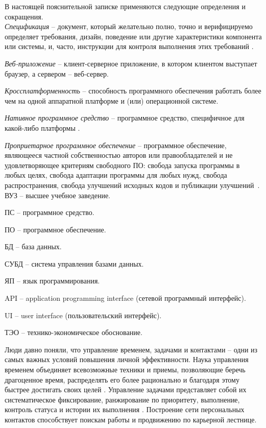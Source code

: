 \label{sec:definitions}

В настоящей пояснительной записке применяются следующие определения и сокращения.
\\

\emph{Спецификация} -- документ, который желательно полно, точно и верифицируемо определяет требования, дизайн, поведение или другие характеристики компонента или системы, и, часто, инструкции для контроля выполнения этих требований \cite{istqb_specification}.

\emph{Веб-приложение} -- клиент-серверное приложение, в котором клиентом выступает браузер, а сервером -- веб-сервер.

\emph{Кроссплатформенность} -- способность программного обеспечения работать более чем на одной аппаратной платформе и (или) операционной системе.

\emph{Нативное программное средство} -- программное средство, специфичное для какой-либо платформы \cite{habr_crossplatform}.

\emph{Проприетарное программное обеспечение} -- программное обеспечение, являющееся частной собственностью авторов или правообладателей и не удовлетворяющее критериям свободного ПО: свобода запуска программы в любых целях, свобода адаптации программы для любых нужд, свобода распространения, свобода улучшений исходных кодов и публикации улучшений~\cite{free_software}.
\\

ВУЗ -- высшее учебное заведение.

ПС -- программное средство.

ПО -- программное обеспечение.

БД -- база данных.

СУБД -- система управления базами данных.

ЯП -- язык программирования.

API -- application programming interface (сетевой программный интерфейс).

UI -- user interface (пользовательский интерфейс).

ТЭО -- технико-экономическое обоснование.


\label{sec:introduction}

Люди давно поняли, что управление временем, задачами и контактами -- одни из самых важных условий повышения личной эффективности. Наука управления временем объединяет всевозможные техники и приемы, позволяющие беречь драгоценное время, распределять его более рационально и благодаря этому быстрее достигать своих целей \cite{time_management}. Управление задачами представляет собой их систематическое фиксирование, ранжирование по приоритету, выполнение, контроль статуса и истории их выполнения \cite{task_management}. Построение сети персональных контактов способствует поискам работы и продвижению по карьерной лестнице. 

